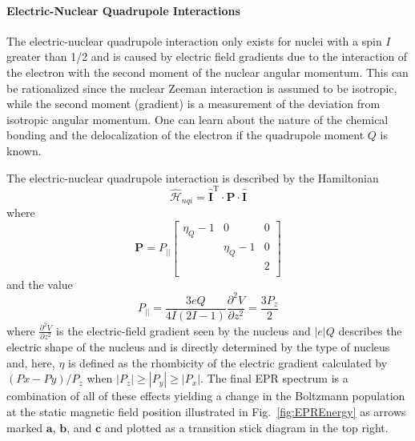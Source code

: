 \paragraph*{Electric-Nuclear Quadrupole Interactions}
The electric-nuclear quadrupole interaction only exists for nuclei with a spin $I$ greater than 1/2 and is caused by electric field gradients due to the interaction of the electron with the second moment of the nuclear angular momentum. This can be rationalized since the nuclear Zeeman interaction is assumed to be isotropic, while the second moment (gradient) is a measurement of the deviation from isotropic angular momentum. One can learn about the nature of the chemical bonding and the delocalization of the electron if the quadrupole moment $Q$ is known.\cite{quadref} 

The electric-nuclear quadrupole interaction is described by the Hamiltonian
\begin{equation}
    \hat{\mathcal{H}}_{nqi} = \mathbf{\hat{I}}^\text{T} \cdot \mathbf{P} \cdot \mathbf{\hat{I}} \label{eq-2:nqi}
\end{equation}
where
\begin{equation}
    \mathbf{P} = P_{||}   \begin{bmatrix}
   \eta_Q -1 & 0 & 0\\
     & \eta_Q -1 & 0\\
    &   & 2\\
   \end{bmatrix}
\end{equation}
and the value 
\begin{equation}
    P_{||} = \frac{3 e Q}{4I(2I-1)}\frac{\partial^2 V}{\partial z^2} = \frac{3 P_z}{2}
\end{equation}
where $\frac{\partial^2 V}{\partial z^2}$ is the electric-field gradient seen by the nucleus and $|e|Q$ describes the electric shape of the nucleus and is directly determined by the type of nucleus and, here, $\eta$ is defined as the rhombicity of the electric gradient calculated by $(Px-Py)/P_z$ when $|P_z|\geq |P_y|\geq |P_x|$. \cite{abragam2012electron,weil2007electron} The final EPR spectrum is a combination of all of these effects yielding a change in the Boltzmann population at the static magnetic field position illustrated in Fig.~\ref{fig:EPREnergy} as arrows marked $\mathbf{a}$, $\mathbf{b}$, and $\mathbf{c}$ and plotted as a transition stick diagram in the top right.


